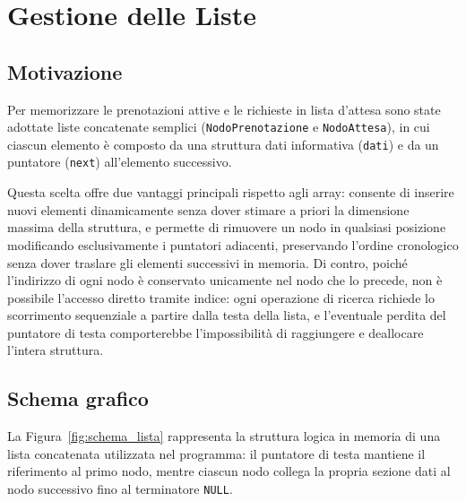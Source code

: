 \documentclass[11pt,a4paper,oneside,openany]{book}
\begin{document}
\section{Gestione delle Liste}

\subsection{Motivazione}
Per memorizzare le prenotazioni attive e le richieste in lista d'attesa sono state adottate liste concatenate semplici (\texttt{NodoPrenotazione} e \texttt{NodoAttesa}), in cui ciascun elemento è composto da una struttura dati informativa (\texttt{dati}) e da un puntatore (\texttt{next}) all'elemento successivo.

Questa scelta offre due vantaggi principali rispetto agli array: consente di inserire nuovi elementi dinamicamente senza dover stimare a priori la dimensione massima della struttura, e permette di rimuovere un nodo in qualsiasi posizione modificando esclusivamente i puntatori adiacenti, preservando l'ordine cronologico senza dover traslare gli elementi successivi in memoria. Di contro, poiché l'indirizzo di ogni nodo è conservato unicamente nel nodo che lo precede, non è possibile l'accesso diretto tramite indice: ogni operazione di ricerca richiede lo scorrimento sequenziale a partire dalla testa della lista, e l'eventuale perdita del puntatore di testa comporterebbe l'impossibilità di raggiungere e deallocare l'intera struttura.

\subsection{Schema grafico}
La Figura~\ref{fig:schema_lista} rappresenta la struttura logica in memoria di una lista concatenata utilizzata nel programma: il puntatore di testa mantiene il riferimento al primo nodo, mentre ciascun nodo collega la propria sezione dati al nodo successivo fino al terminatore \texttt{NULL}.
\end{document}
